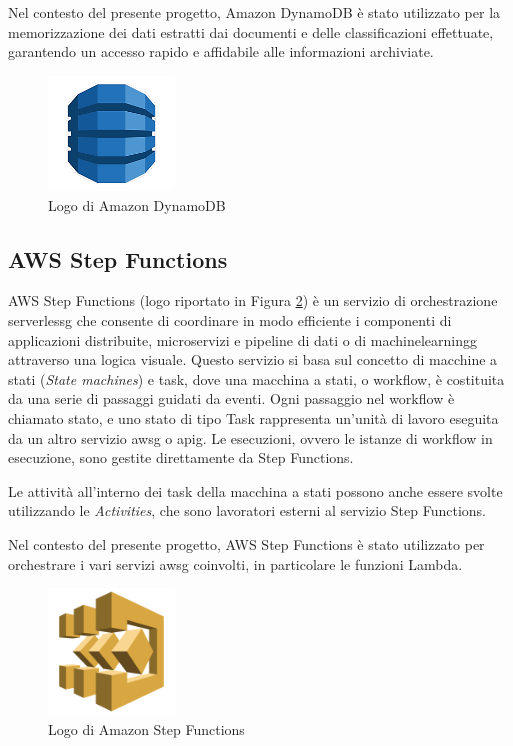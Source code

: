 Nel contesto del presente progetto, Amazon DynamoDB è stato utilizzato per la memorizzazione dei dati estratti dai documenti e delle classificazioni effettuate, garantendo un accesso rapido e affidabile alle informazioni archiviate.



\begin{figure}[h]
  \centering
  \includegraphics[width=0.3\textwidth]{img/tecnologie/DynamoDB.png}
  \caption{Logo di Amazon DynamoDB}
  \label{fig:dynamodb}
\end{figure}
\subsection{AWS Step Functions}
AWS Step Functions (logo riportato in Figura \ref{fig:stepfunctions}) è un servizio di orchestrazione \gls{serverlessg} che consente di coordinare in modo efficiente i componenti di applicazioni distribuite, microservizi e pipeline di dati o di \gls{machinelearningg} attraverso una logica visuale. Questo servizio si basa sul concetto di macchine a stati (\textit{State machines}) e task, dove una macchina a stati, o workflow, è costituita da una serie di passaggi guidati da eventi. Ogni passaggio nel workflow è chiamato stato, e uno stato di tipo Task rappresenta un'unità di lavoro eseguita da un altro servizio \gls{awsg} o \gls{apig}. Le esecuzioni, ovvero le istanze di workflow in esecuzione, sono gestite direttamente da Step Functions.

Le attività all'interno dei task della macchina a stati possono anche essere svolte utilizzando le \textit{Activities}, che sono lavoratori esterni al servizio Step Functions.

Nel contesto del presente progetto, AWS Step Functions è stato utilizzato per orchestrare i vari servizi \gls{awsg} coinvolti, in particolare le funzioni Lambda. 


\begin{figure}[h]
  \centering
  \includegraphics[width=0.3\textwidth]{img/tecnologie/stepfunctions.png}
  \caption{Logo di Amazon Step Functions}
  \label{fig:stepfunctions}
\end{figure}

